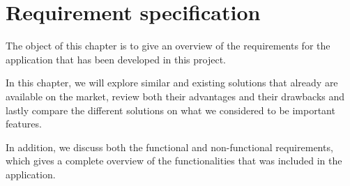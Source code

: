 \chapter{Requirement specification}
\label {sec:recSpecification}

The object of this chapter is to give an overview of the requirements for the application that has been developed in this project.

In this chapter, we will explore similar and existing solutions that already are available on the market, review both their advantages and their drawbacks and lastly compare the different solutions on what we considered to be important features. 

In addition, we discuss both the functional and non-functional requirements, which gives a complete overview of the functionalities that was included in the application.

\newpage






